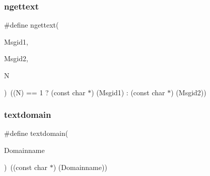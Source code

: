 \mbox{\label{gettext_8h_a248c64613ae95f3477511c239fe9c5c1}} 
\subsubsection{ngettext}
{\footnotesize\ttfamily \#define ngettext(\begin{DoxyParamCaption}\item[{}]{Msgid1,  }\item[{}]{Msgid2,  }\item[{}]{N }\end{DoxyParamCaption})~((N) == 1 ? (const char $\ast$) (Msgid1) \+: (const char $\ast$) (Msgid2))}

\mbox{\label{gettext_8h_aba3653075c8f1f84c741ef23b2266f89}} 
\subsubsection{textdomain}
{\footnotesize\ttfamily \#define textdomain(\begin{DoxyParamCaption}\item[{}]{Domainname }\end{DoxyParamCaption})~((const char $\ast$) (Domainname))}


